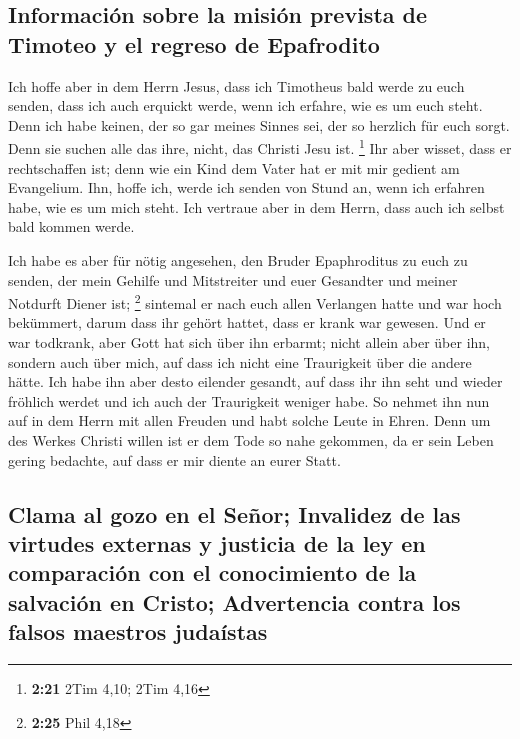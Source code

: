 \hypertarget{informaciuxf3n-sobre-la-misiuxf3n-prevista-de-timoteo-y-el-regreso-de-epafrodito}{%
\subsection{Información sobre la misión prevista de Timoteo y el regreso
de
Epafrodito}\label{informaciuxf3n-sobre-la-misiuxf3n-prevista-de-timoteo-y-el-regreso-de-epafrodito}}

 Ich hoffe aber in dem Herrn Jesus, dass ich Timotheus
bald werde zu euch senden, dass ich auch erquickt werde, wenn ich
erfahre, wie es um euch steht.  Denn ich habe keinen, der
so gar meines Sinnes sei, der so herzlich für euch sorgt.
 Denn sie suchen alle das ihre, nicht, das Christi Jesu
ist. \footnote{\textbf{2:21} 2Tim 4,10; 2Tim 4,16}  Ihr
aber wisset, dass er rechtschaffen ist; denn wie ein Kind dem Vater hat
er mit mir gedient am Evangelium.  Ihn, hoffe ich, werde
ich senden von Stund an, wenn ich erfahren habe, wie es um mich steht.
 Ich vertraue aber in dem Herrn, dass auch ich selbst
bald kommen werde.

 Ich habe es aber für nötig angesehen, den Bruder
Epaphroditus zu euch zu senden, der mein Gehilfe und Mitstreiter und
euer Gesandter und meiner Notdurft Diener ist; \footnote{\textbf{2:25}
  Phil 4,18}  sintemal er nach euch allen Verlangen hatte
und war hoch bekümmert, darum dass ihr gehört hattet, dass er krank war
gewesen.  Und er war todkrank, aber Gott hat sich über
ihn erbarmt; nicht allein aber über ihn, sondern auch über mich, auf
dass ich nicht eine Traurigkeit über die andere hätte. 
Ich habe ihn aber desto eilender gesandt, auf dass ihr ihn seht und
wieder fröhlich werdet und ich auch der Traurigkeit weniger habe.
 So nehmet ihn nun auf in dem Herrn mit allen Freuden und
habt solche Leute in Ehren.  Denn um des Werkes Christi
willen ist er dem Tode so nahe gekommen, da er sein Leben gering
bedachte, auf dass er mir diente an eurer Statt.

\hypertarget{clama-al-gozo-en-el-seuxf1or-invalidez-de-las-virtudes-externas-y-justicia-de-la-ley-en-comparaciuxf3n-con-el-conocimiento-de-la-salvaciuxf3n-en-cristo-advertencia-contra-los-falsos-maestros-judauxedstas}{%
\subsection{Clama al gozo en el Señor; Invalidez de las virtudes
externas y justicia de la ley en comparación con el conocimiento de la
salvación en Cristo; Advertencia contra los falsos maestros
judaístas}\label{clama-al-gozo-en-el-seuxf1or-invalidez-de-las-virtudes-externas-y-justicia-de-la-ley-en-comparaciuxf3n-con-el-conocimiento-de-la-salvaciuxf3n-en-cristo-advertencia-contra-los-falsos-maestros-judauxedstas}}

